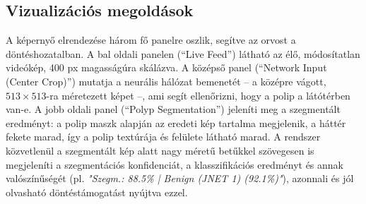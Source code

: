 \documentclass[12pt, a4paper]{report}
\begin{document}
\subsection{Vizualizációs megoldások}
A képernyő elrendezése három fő panelre oszlik, segítve az orvost a döntéshozatalban. A bal oldali panelen (``Live Feed'') látható az élő, módosítatlan videókép, 400 px magasságúra skálázva. A középső panel (``Network Input (Center Crop)'') mutatja a neurális hálózat bemenetét – a középre vágott, $513 \times 513$-ra méretezett képet –, ami segít ellenőrizni, hogy a polip a látótérben van-e. A jobb oldali panel (``Polyp Segmentation'') jeleníti meg a szegmentált eredményt: a polip maszk alapján az eredeti kép tartalma megjelenik, a háttér fekete marad, így a polip textúrája és felülete látható marad. A rendszer közvetlenül a szegmentált kép alatt nagy méretű betűkkel szövegesen is megjeleníti a szegmentációs konfidenciát, a klasszifikációs eredményt és annak valószínűségét (pl. \textit{"Szegm.: 88.5\% | Benign (JNET 1) (92.1\%)"}), azonnali és jól olvasható döntéstámogatást nyújtva ezzel.
\end{document}
